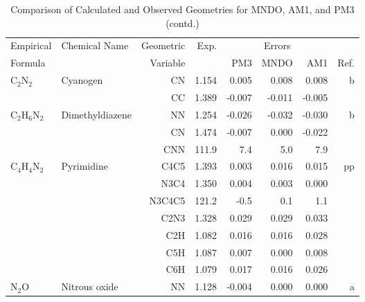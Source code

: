 \begin{table}
\caption{\label{geotabf}Comparison of Calculated and Observed Geometries for 
MNDO, AM1, and PM3 (contd.)}
\begin{center}
\compresstable
\begin{tabular}{llrrrrrr}
 Empirical  & Chemical Name &  Geometric &  Exp. & \multicolumn{3}{c}{Errors} & \\
  Formula   &               &  Variable &        & PM3  & MNDO  &  AM1 & Ref.\\
\hline
 C$_2$N$_2$        & Cyanogen                           &CN            &     1.154   &     0.005 &     0.008 &     0.008 &     b \\
             &                                    &CC            &     1.389   &    -0.007 &    -0.011 &    -0.005 &       \\
 C$_2$H$_6$N$_2$      & Dimethyldiazene                    &NN            &     1.254   &    -0.026 &    -0.032 &    -0.030 &     b \\
             &                                    &CN            &     1.474   &    -0.007 &     0.000 &    -0.022 &       \\
             &                                    &CNN         &     111.9   &       7.4 &       5.0 &       7.9   &       \\
 C$_4$H$_4$N$_2$      & Pyrimidine                         &C4C5          &     1.393   &     0.003 &     0.016 &     0.015 &    pp \\
             &                                    &N3C4          &     1.350   &     0.004 &     0.003 &     0.000 &       \\
             &                                    &N3C4C5      &     121.2   &      -0.5 &       0.1 &       1.1   &       \\
             &                                    &C2N3          &     1.328   &     0.029 &     0.029 &     0.033 &       \\
             &                                    &C2H           &     1.082   &     0.016 &     0.016 &     0.028 &       \\
             &                                    &C5H           &     1.087   &     0.007 &     0.000 &     0.008 &       \\
             &                                    &C6H           &     1.079   &     0.017 &     0.016 &     0.026 &       \\
 N$_2$O         & Nitrous oxide                      &NN            &     1.128   &    -0.004 &     0.000 &     0.000 &     a \\

\end{tabular}
\end{center}
\end{table}
